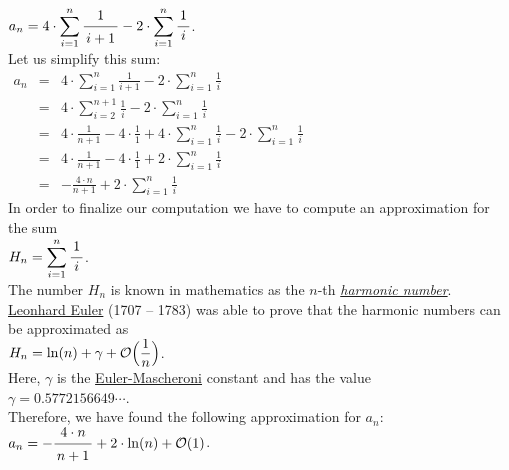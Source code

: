 $\displaystyle a_{n} = 4 \cdot \sum\limits_{i=1}^n \bruch{1}{i+1} - 2 \cdot \sum\limits_{i=1}^n \bruch{1}{i}$.  
\\[0.2cm]
Let us simplify this sum:
\\[0.2cm]
\hspace*{1.3cm}
$
\begin{array}{lcl}
 a_{n} & = & \displaystyle 4 \cdot \sum_{i=1}^n \frac{1}{i+1} - 2 \cdot \sum_{i=1}^n \frac{1}{i} \\[0.5cm]
       & = & \displaystyle 4 \cdot \sum_{i=2}^{n+1} \frac{1}{i} - 2 \cdot \sum_{i=1}^n \frac{1}{i} \\[0.5cm]
       & = & \displaystyle 4 \cdot \frac{1}{n+1} - 4 \cdot \frac{1}{1} + 4 \cdot \sum_{i=1}^{n} \frac{1}{i} - 2 \cdot \sum_{i=1}^n \frac{1}{i} \\[0.5cm]
       & = & \displaystyle 4 \cdot \frac{1}{n+1} - 4 \cdot \frac{1}{1} + 2 \cdot \sum_{i=1}^{n} \frac{1}{i}  \\[0.5cm]
       & = & \displaystyle - \frac{4 \cdot n}{n+1}  + 2 \cdot \sum_{i=1}^{n} \frac{1}{i}  
\end{array}
$
\\[0.2cm]
In order to finalize our computation we have to compute an approximation for the sum
\\[0.2cm]
\hspace*{1.3cm}
$H_n = \displaystyle\sum\limits_{i=1}^{n}\bruch{1}{i}$.
\\[0.2cm] 
The number $H_n$ is known in mathematics as the $n$-th 
\href{http://en.wikipedia.org/wiki/Harmonic_number}{\emph{harmonic number}}.
\href{http://en.wikipedia.org/wiki/Leonhard_Euler}{Leonhard Euler} (1707 -- 1783) was able to prove
that the harmonic numbers can be approximated as
\\[0.2cm]
\hspace*{1.3cm}
$\displaystyle H_n = \ln(n) + \gamma + \mathcal{O}\Bigl(\frac{1}{n}\Bigr)$. 
\\[0.2cm]  
Here, $\gamma$ is the
\href{http://en.wikipedia.org/wiki/Euler-Mascheroni_constant}{Euler-Mascheroni} constant and has the
value
\\[0.2cm]
\hspace*{1.3cm}
$\gamma = 0.5772156649 \cdots$.
\\[0.2cm]
Therefore, we have found the following approximation for $a_n$:
\\[0.2cm]
\hspace*{1.3cm}
$a_n = - \bruch{4 \cdot n}{n+1}  + 2 \cdot \ln(n) + \Oh(1)$.
\\[0.2cm] 
